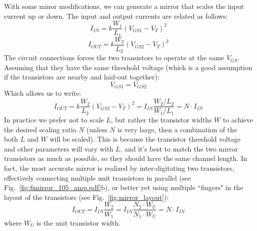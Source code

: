 With some minor modifications, we can generate a mirror that scales the input current up or down. The input and output currents are related as follows:
%
\begin{equation}
	{I_{IN}} = k\frac{{{W_1}}}{{{L_1}}}{({V_{GS1}} - {V_T})^2}
\end{equation}
%
\begin{equation}
	{I_{OUT}} = k\frac{{{W_2}}}{{{L_2}}}{({V_{GS2}} - {V_T})^2}
\end{equation}
%
The circuit connections forces the two transistors to operate at the same $V_{GS}$.  Assuming that they have the same threshold voltage (which is a good assumption if the transistors are nearby and laid-out together):
%
\begin{equation}
	{V_{GS1}} = {V_{GS2}}
\end{equation}
%
Which allows us to write:
%
\begin{equation}
	{I_{OUT}} = k\frac{{{W_2}}}{{{L_2}}}{({V_{GS2}} - {V_T})^2} = {I_{IN}}\frac{{{W_2}/{L_2}}}{{{W_1}/{L_1}}} = N \cdot {I_{IN}}
\end{equation}
%
In practice we prefer not to scale $L$, but rather the transistor widths $W$ to achieve the desired scaling ratio $N$ (unless $N$ is very large, then a combination of the both $L$ and $W$ will be scaled).  This is because the transistor threshold voltage and other parameters will vary with $L$, and it's best to match the two mirror transistors as much as possible, so they should have the same channel length.  In fact, the most accurate mirror is realized by inter-digitating two transistors, effectively connecting multiple unit transistors in parallel (see Fig.~\ref{fig:6mirror_105_amp.pdf}b), or better yet using multiple ``fingers" in the layout of the transistors (see Fig.~\ref{fig:mirror_layout}):
%
\begin{equation}
	{I_{OUT}} =  {I_{IN}}\frac{W_2}{W_1} = {I_{IN}}\frac{N_2\cdot W_U}{N_1\cdot W_U} = N \cdot {I_{IN}}
\end{equation}
%
where $W_U$ is the unit transistor width.  

